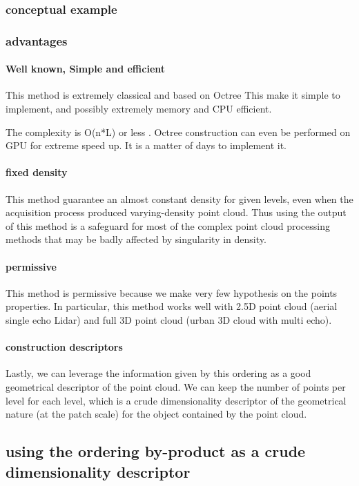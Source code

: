 			
		\subsubsection{conceptual example}
			
			
		\subsubsection{advantages}	
			\paragraph{Well known, Simple and efficient}
				This method is extremely classical and based on Octree This make it simple to implement, and possibly extremely memory and CPU efficient.

				The complexity is O(n*L) or less .				
				Octree construction can even be performed on GPU for extreme speed up.
				It is a matter of days to implement it.
			\paragraph{fixed density}
				This method guarantee an almost constant density for given levels, even when the acquisition process produced varying-density point cloud.
				Thus using the output of this method is a safeguard for most of the complex point cloud processing methods that may be badly affected by singularity in density.
			\paragraph{permissive}
				This method is permissive because we make very few hypothesis on the points properties. In particular, this method works well with 2.5D point cloud (aerial single echo Lidar) and full 3D point cloud (urban 3D cloud with multi echo).
			\paragraph{construction descriptors}
				Lastly, we can leverage the information given by this ordering as a good geometrical descriptor of the point cloud.
				We can keep the number of points per level for each level, which is a crude dimensionality descriptor of the geometrical nature (at the patch scale) for the object contained by the point cloud.
				
	\subsection{using the ordering by-product as a crude dimensionality descriptor}
